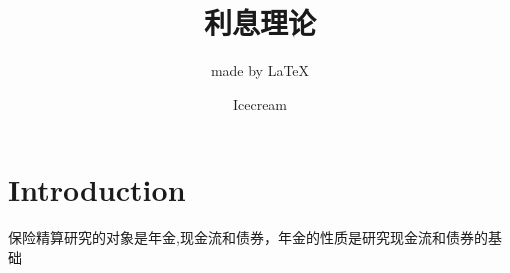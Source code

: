\documentclass[cn,11pt,chinese,toc=twocol]{elegantbook}
\title{利息理论}
\subtitle{made by \LaTeX{} }
\author{Icecream}
\begin{document}
\def\angles#1{{%
		\vbox{\hrule height .2pt
			\kern 1pt
			\hbox{$\scriptstyle {#1}\kern 1pt$}%
		}\kern-.05pt \vrule width .2pt
}}
%
\maketitle
\tableofcontents

\chapter*{Introduction}
保险精算研究的对象是年金,现金流和债券，年金的性质是研究现金流和债券的基础







\end{document}
